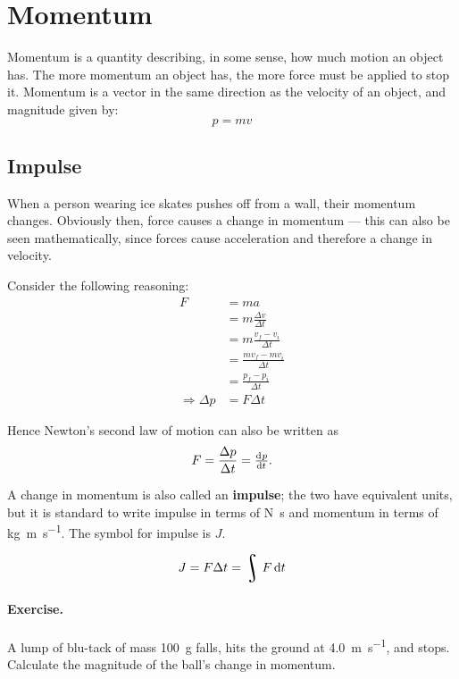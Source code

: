 \documentclass[a4paper]{amsbook}
\DeclareMathOperator*{\rint}{\scalerel*{\rotatebox{17}{$\!\int\!$}}{\int}}
\begin{document}
\section{Momentum}
Momentum is a quantity describing, in some sense, how much motion an object has. The more momentum an object
has, the more force must be applied to stop it. Momentum is a vector in the same direction as the velocity of
an object, and magnitude given by:
\begin{equation}
  p = mv
\end{equation}

\subsection{Impulse}
When a person wearing ice skates pushes off from a wall, their momentum changes. Obviously then, force causes a change
in momentum --- this can also be seen mathematically, since forces cause acceleration and therefore a change in velocity.

Consider the following reasoning:
\begin{align*}
  F &= ma\\
  &= m \frac{\Delta v}{\Delta t}\\
  &= m \frac{v_f - v_i}{\Delta t}\\
  &= \frac{mv_f - mv_i}{\Delta t}\\
  &= \frac{p_f - p_i}{\Delta t}\\
  \Rightarrow \Delta p &= F \Delta t
\end{align*}

Hence Newton's second law of motion can also be written as
\begin{equation}
  F = \frac{\Delta p}{\Delta t} = \od{p}{t}.
\end{equation}

A change in momentum is also called an \textbf{impulse}; the two have equivalent units, but it is standard to write impulse in
terms of \si{\newton\second} and momentum in terms of \si{\kilo\gram\meter\per\second}. The symbol for impulse is $ J $.

\begin{equation}
  J = F \Delta t = \rint F \dif{t}
\end{equation}

\paragraph{Exercise.} A lump of blu-tack of mass \SI{100}{\gram} falls, hits the ground at \SI{4.0}{\metre\per\second}, and stops. Calculate
the magnitude of the ball's change in momentum.
\end{document}
